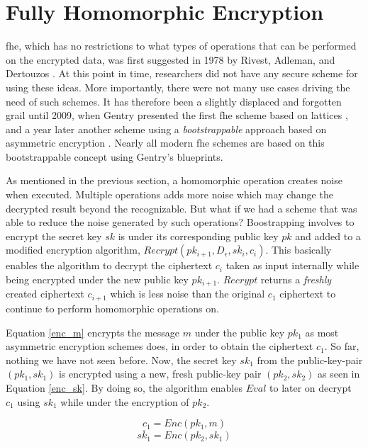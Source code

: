 \section{Fully Homomorphic Encryption}

\Gls{fhe}, which has no restrictions to what types of operations that can be performed on the encrypted data, was first suggested in 1978 by Rivest, Adleman, and Dertouzos \cite{rivest1978data}. At this point in time, researchers did not have any secure scheme for using these ideas. More importantly, there were not many use cases driving the need of such schemes. It has therefore been a slightly displaced and forgotten grail until 2009,
when Gentry presented the first \gls{fhe} scheme based on lattices \cite{Gentry_first_lattices}, and a year later another scheme using a \emph{bootstrappable} approach based on asymmetric encryption \citep{Gentry_computing_arb_func_enc_data}. Nearly all modern \gls{fhe} schemes are based on this bootstrappable concept using Gentry's blueprints. 

As mentioned in the previous section, a homomorphic operation creates noise when executed. Multiple operations adds more noise which may change the decrypted result beyond the recognizable. But what if we had a scheme that was able to reduce the noise generated by such operations? Boostrapping involves to encrypt the secret key $sk$ is under its corresponding public key $pk$ and added to a modified encryption algorithm, $Recrypt(pk_{i+1}, D_{\epsilon}, \overline{sk_i}, c_i)$. This basically enables the algorithm to decrypt the ciphertext $c_i$ taken as input internally while being encrypted under the new public key $pk_{i+1}$. $Recrypt$ returns a \emph{freshly} created ciphertext $c_{i+1}$ which is less noise than the original $c_1$ ciphertext to continue to perform homomorphic operations on.


Equation \ref{enc_m} encrypts the message $m$ under the public key $pk_1$ as most asymmetric encryption schemes does, in order to obtain the ciphertext $c_1$. So far, nothing we have not seen before. Now, the secret key $sk_1$ from the public-key-pair $(pk_1,sk_1)$ is encrypted using a new, fresh public-key pair $(pk_2, sk_2)$ as seen in Equation \ref{enc_sk}. By doing so, the algorithm enables $Eval$ to later on decrypt $c_1$ using $sk_1$ while under the encryption of $pk_2$.

\begin{equation}
\label{enc_m}
c_1 = Enc(pk_1, m)
\end{equation}
\begin{equation}
\label{enc_sk}
\overline{sk_1} = Enc(pk_2, sk_1)
\end{equation}


